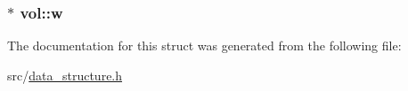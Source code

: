 \subsubsection[{w}]{$\ast$ vol\+::w}\hypertarget{structvol_a2e7e34090178b6d695341da3d1675c93}{}\label{structvol_a2e7e34090178b6d695341da3d1675c93}


The documentation for this struct was generated from the following file\+:\begin{DoxyCompactItemize}
\item 
src/\hyperlink{data__structure_8h}{data\+\_\+structure.\+h}\end{DoxyCompactItemize}
